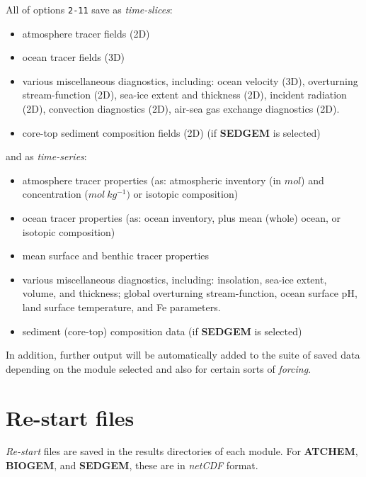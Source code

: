 \documentclass[11pt,fleqn]{book} %
\begin{document}
\noindent All of options \texttt{2-11} save as \textit{time-slices}:
\begin{itemize}[noitemsep]
\setlength{\itemindent}{.2in}
\item atmosphere tracer fields (2D)
\item ocean tracer fields (3D)
\item various miscellaneous diagnostics, including: ocean velocity (3D), overturning stream-function (2D), sea-ice extent and thickness (2D), incident radiation (2D), convection diagnostics (2D), air-sea gas exchange diagnostics (2D).
\item core-top sediment composition fields (2D) (if \textbf{SEDGEM} is selected)
\end{itemize}
and as \textit{time-series}:
\begin{itemize}[noitemsep]
\setlength{\itemindent}{.2in}
\item atmosphere tracer properties (as: atmospheric inventory (in \(mol\)) and concentration (\(mol\:kg^{-1})\) or isotopic composition)
\item ocean tracer properties (as: ocean inventory, plus mean (whole) ocean, or isotopic composition)
\item mean surface and benthic tracer properties
\item various miscellaneous diagnostics, including: insolation, sea-ice extent, volume, and thickness; global overturning stream-function, ocean surface pH, land surface temperature, and Fe parameters.
\item sediment (core-top) composition data (if \textbf{SEDGEM} is selected)
\end{itemize}

In addition, further output will be automatically added to the suite of saved data depending on the module selected and also for certain sorts of \textit{forcing}.


\newpage


\section{Re-start files}

\textit{Re-start} files are saved in the results directories of each module.
For \textbf{ATCHEM}, \textbf{BIOGEM}, and \textbf{SEDGEM}, these are in \textit{netCDF} format.
\end{document}

